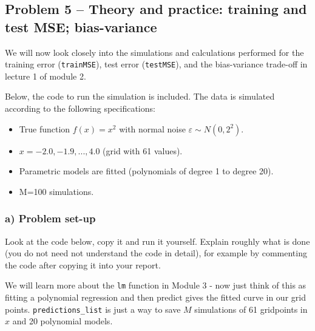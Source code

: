 \documentclass[
]{article}
\providecommand{\tightlist}{%
  \setlength{\itemsep}{0pt}\setlength{\parskip}{0pt}}
\begin{document}
\hypertarget{problem-5-theory-and-practice-training-and-test-mse-bias-variance}{%
\subsection{Problem 5 -- Theory and practice: training and test MSE;
bias-variance}\label{problem-5-theory-and-practice-training-and-test-mse-bias-variance}}

We will now look closely into the simulations and calculations performed
for the training error (\texttt{trainMSE}), test error
(\texttt{testMSE}), and the bias-variance trade-off in lecture 1 of
module 2.

Below, the code to run the simulation is included. The data is simulated
according to the following specifications:

\begin{itemize}
\tightlist
\item
  True function \(f(x)=x^2\) with normal noise
  \(\varepsilon \sim N(0,2^2)\).
\item
  \(x= -2.0, -1.9, ... ,4.0\) (grid with 61 values).
\item
  Parametric models are fitted (polynomials of degree 1 to degree 20).
\item
  M=100 simulations.
\end{itemize}

\hypertarget{a-problem-set-up}{%
\subsubsection{a) Problem set-up}\label{a-problem-set-up}}

Look at the code below, copy it and run it yourself. Explain roughly
what is done (you do not need not understand the code in detail), for
example by commenting the code after copying it into your report.

We will learn more about the \texttt{lm} function in Module 3 - now just
think of this as fitting a polynomial regression and then predict gives
the fitted curve in our grid points. \texttt{predictions\_list} is just
a way to save \(M\) simulations of 61 gridpoints in \(x\) and 20
polynomial models.
\end{document}
